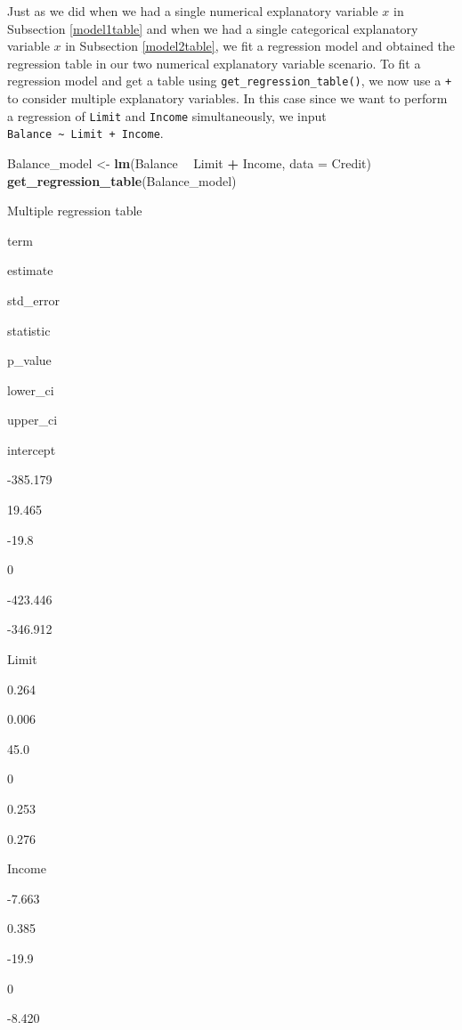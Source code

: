 \documentclass[12pt,]{krantz}
\makeatletter
\newenvironment{Shaded}{\begin{snugshade}}{\end{snugshade}}
\newcommand{\KeywordTok}[1]{\textcolor[rgb]{0.27,0.27,0.27}{\textbf{#1}}}
\newcommand{\DataTypeTok}[1]{\textcolor[rgb]{0.27,0.27,0.27}{#1}}
\newcommand{\StringTok}[1]{\textcolor[rgb]{0.5,0.5,0.5}{#1}}
\newcommand{\OperatorTok}[1]{\textcolor[rgb]{0.43,0.43,0.43}{\textbf{#1}}}
\newcommand{\NormalTok}[1]{#1}
\newenvironment{kframe}{%
\medskip{}
\setlength{\fboxsep}{.8em}
 \def\at@end@of@kframe{}%
 \ifinner\ifhmode%
  \def\at@end@of@kframe{\end{minipage}}%
  \begin{minipage}{\columnwidth}%
 \fi\fi%
 \def\FrameCommand##1{\hskip\@totalleftmargin \hskip-\fboxsep
 \colorbox{shadecolor}{##1}\hskip-\fboxsep
     \hskip-\linewidth \hskip-\@totalleftmargin \hskip\columnwidth}%
 \MakeFramed {\advance\hsize-\width
   \@totalleftmargin\z@ \linewidth\hsize
   \@setminipage}}%
 {\par\unskip\endMakeFramed%
 \at@end@of@kframe}
\renewenvironment{Shaded}{\begin{kframe}}{\end{kframe}}
\makeatother
\begin{document}
Just as we did when we had a single numerical explanatory variable \(x\)
in Subsection \ref{model1table} and when we had a single categorical
explanatory variable \(x\) in Subsection \ref{model2table}, we fit a
regression model and obtained the regression table in our two numerical
explanatory variable scenario. To fit a regression model and get a table
using \texttt{get\_regression\_table()}, we now use a \texttt{+} to
consider multiple explanatory variables. In this case since we want to
perform a regression of \texttt{Limit} and \texttt{Income}
simultaneously, we input
\texttt{Balance\ \textasciitilde{}\ Limit\ +\ Income}.

\begin{Shaded}
\begin{Highlighting}[]
\NormalTok{Balance_model <-}\StringTok{ }\KeywordTok{lm}\NormalTok{(Balance }\OperatorTok{~}\StringTok{ }\NormalTok{Limit }\OperatorTok{+}\StringTok{ }\NormalTok{Income, }\DataTypeTok{data =}\NormalTok{ Credit)}
\KeywordTok{get_regression_table}\NormalTok{(Balance_model)}
\end{Highlighting}
\end{Shaded}

\label{tab:model3-table-output}Multiple regression table

term

estimate

std\_error

statistic

p\_value

lower\_ci

upper\_ci

intercept

-385.179

19.465

-19.8

0

-423.446

-346.912

Limit

0.264

0.006

45.0

0

0.253

0.276

Income

-7.663

0.385

-19.9

0

-8.420
\end{document}
